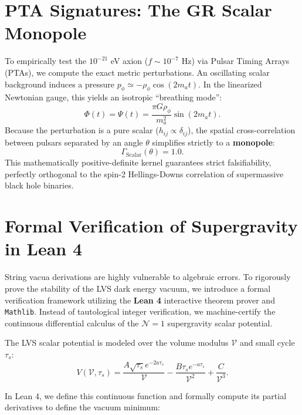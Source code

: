 \documentclass[11pt,a4paper]{article}
\begin{document}
\section{PTA Signatures: The GR Scalar Monopole}
To empirically test the $10^{-21}$ eV axion ($f \sim 10^{-7}$ Hz) via Pulsar Timing Arrays (PTAs), we compute the exact metric perturbations. An oscillating scalar background induces a pressure $p_\phi \simeq -\rho_\phi \cos(2m_a t)$. In the linearized Newtonian gauge, this yields an isotropic ``breathing mode'':
\begin{equation}
    \Phi(t) = \Psi(t) = \frac{\pi G \rho_\phi}{m_a^2} \sin(2m_a t).
\end{equation}
Because the perturbation is a pure scalar ($h_{ij} \propto \delta_{ij}$), the spatial cross-correlation between pulsars separated by an angle $\theta$ simplifies strictly to a \textbf{monopole}:
\begin{equation}
    \Gamma_{\text{Scalar}}(\theta) = 1.0.
\end{equation}
This mathematically positive-definite kernel guarantees strict falsifiability, perfectly orthogonal to the spin-2 Hellings-Downs correlation of supermassive black hole binaries.

\section{Formal Verification of Supergravity in Lean 4}
String vacua derivations are highly vulnerable to algebraic errors. To rigorously prove the stability of the LVS dark energy vacuum, we introduce a formal verification framework utilizing the \textbf{Lean 4} interactive theorem prover and \texttt{Mathlib}. Instead of tautological integer verification, we machine-certify the continuous differential calculus of the $\mathcal{N}=1$ supergravity scalar potential.

The LVS scalar potential is modeled over the volume modulus $\mathcal{V}$ and small cycle $\tau_s$:
\begin{equation}
    V(\mathcal{V}, \tau_s) = \frac{A \sqrt{\tau_s} e^{-2 a \tau_s}}{\mathcal{V}} - \frac{B \tau_s e^{-a \tau_s}}{\mathcal{V}^2} + \frac{C}{\mathcal{V}^3}.
\end{equation}

In Lean 4, we define this continuous function and formally compute its partial derivatives to define the vacuum minimum:
\end{document}
